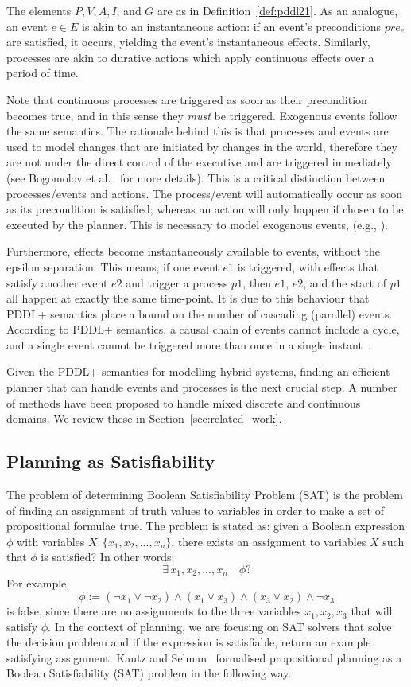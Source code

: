 The elements $P,V,A,I$, and $G$ are as in Definition~\ref{def:pddl21}. As an analogue, an event $e\in E$ is akin to an instantaneous action: if an event's preconditions $pre_e$ are satisfied, it occurs, yielding the event's instantaneous effects. Similarly, processes are akin to durative actions which apply continuous effects over a period of time.

Note that continuous processes are triggered as soon as their precondition becomes true, and in this sense they \textit{must} be triggered. Exogenous events follow the same semantics. The rationale behind this is that processes and events are used to model changes that are initiated by changes in the world, therefore they are not under the direct control of the executive and are triggered immediately (see Bogomolov et al.~\cite{bogomolov14} for more details). This is a critical distinction between processes/events and actions. The process/event will automatically occur as soon as its precondition is satisfied; whereas an action will only happen if chosen to be executed by the planner. This is necessary to model exogenous events, (e.g., \cite{gerevini2006approach}).

Furthermore, effects become instantaneously available to events, without the epsilon separation. This means, if one event $e1$ is triggered, with effects that satisfy another event $e2$ and trigger a process $p1$, then $e1$, $e2$, and the start of $p1$ all happen at exactly the same time-point. It is due to this behaviour that PDDL+ semantics place a bound on the number of cascading (parallel) events. According to PDDL+ semantics, a causal chain of events cannot include a cycle, and a single event cannot be triggered more than once in a single instant~\cite{fox2002pddl+}.

Given the PDDL+ semantics for modelling hybrid systems, finding an efficient planner that can handle events and processes is the next crucial step. A number of methods have been proposed to handle mixed discrete and continuous domains. We review these in Section~\ref{sec:related_work}.

\subsection{Planning as Satisfiability}

The problem of determining Boolean Satisfiability Problem (SAT) is the problem of finding an assignment of truth values to variables in order to make a set of propositional formulae true. The problem is stated as: given a Boolean expression $\phi$ with variables $X: \{ x_1, x_2, ... , x_n\}$, there exists an assignment to variables $X$ such that $\phi$ is satisfied? In other words:
$$
\exists \, x_1, x_2, ... , x_n \quad\phi?
$$
For example,
$$
\phi := (\neg x_1 \vee \neg x_2) \wedge (x_1 \vee x_3) \wedge (x_3 \vee x_2) \wedge \neg x_3
$$
is false, since there are no assignments to the three variables $x_1, x_2, x_3$ that will satisfy $\phi$.
%
In the context of planning, we are focusing on SAT solvers that solve the decision problem and if the expression is satisfiable, return an example satisfying assignment. Kautz and Selman~\cite{kau92} formalised propositional planning as a Boolean Satisfiability (SAT) problem in the following way.


